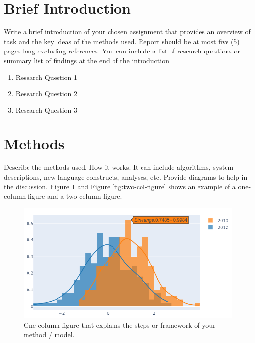 \documentclass{article}
\begin{document}

\section{Brief Introduction}
Write a brief introduction of your chosen assignment that provides an overview of task and the key ideas of the methods used.
Report should be at most five (5) pages long excluding references.
You can include a list of research questions or summary list of findings at the end of the introduction.

\begin{enumerate}
    \item Research Question 1
    \item Research Question 2
    \item Research Question 3
\end{enumerate}

\section{Methods}
Describe the methods used. How it works. It can include algorithms, system descriptions, new language constructs, analyses, etc.
Provide diagrams to help in the discussion. Figure \ref{fig:one-col-figure} and Figure \ref{fig:two-col-figure} shows an example of a one-column figure and a two-column figure. 
\begin{figure}
    \centering
    \includegraphics[width=\linewidth]{figures/example_plot.png}
    \caption{One-column figure that explains the steps or framework of your method / model.}
    \label{fig:one-col-figure}
\end{figure}
\end{document}
